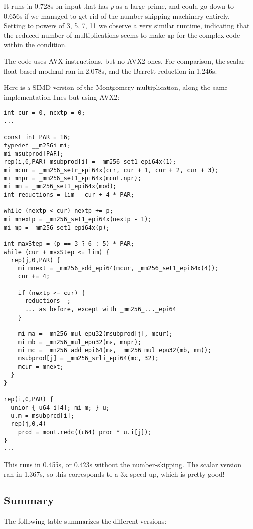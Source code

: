 It runs in 0.728s on input that has $p$ as a large prime,
and could go down to 0.656s if we managed to get rid of the number-skipping machinery entirely.
Setting \verb@mod@ to powers of 3, 5, 7, 11 we observe a very similar runtime, indicating that the reduced number of multiplications seems to make up for the complex code within the condition.

The code uses AVX instructions, but no AVX2 ones.
For comparison, the scalar float-based modmul ran in 2.078s, and the Barrett reduction in 1.246s.

Here is a SIMD version of the Montgomery multiplication, along the same implementation lines but using AVX2:
\begin{lstlisting}
int cur = 0, nextp = 0;
...

const int PAR = 16;
typedef __m256i mi;
mi msubprod[PAR];
rep(i,0,PAR) msubprod[i] = _mm256_set1_epi64x(1);
mi mcur = _mm256_setr_epi64x(cur, cur + 1, cur + 2, cur + 3);
mi mnpr = _mm256_set1_epi64x(mont.npr);
mi mm = _mm256_set1_epi64x(mod);
int reductions = lim - cur + 4 * PAR;

while (nextp < cur) nextp += p;
mi mnextp = _mm256_set1_epi64x(nextp - 1);
mi mp = _mm256_set1_epi64x(p);

int maxStep = (p == 3 ? 6 : 5) * PAR;
while (cur + maxStep <= lim) {
  rep(j,0,PAR) {
    mi mnext = _mm256_add_epi64(mcur, _mm256_set1_epi64x(4));
    cur += 4;

    if (nextp <= cur) {
      reductions--;
      ... as before, except with _mm256_..._epi64
    }

    mi ma = _mm256_mul_epu32(msubprod[j], mcur);
    mi mb = _mm256_mul_epu32(ma, mnpr);
    mi mc = _mm256_add_epi64(ma, _mm256_mul_epu32(mb, mm));
    msubprod[j] = _mm256_srli_epi64(mc, 32);
    mcur = mnext;
  }
}

rep(i,0,PAR) {
  union { u64 i[4]; mi m; } u;
  u.m = msubprod[i];
  rep(j,0,4)
    prod = mont.redc((u64) prod * u.i[j]);
}
...
\end{lstlisting}

This runs in 0.455s, or 0.423s without the number-skipping.
The scalar version ran in 1.367s, so this corresponds to a 3x speed-up, which is pretty good!

\subsection{Summary}
The following table summarizes the different versions:


